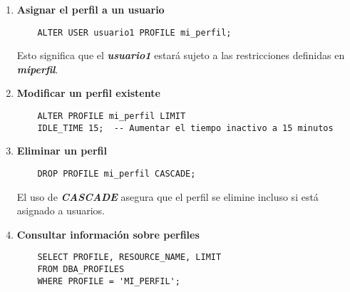 \begin{enumerate}
  \item \textbf{Asignar el perfil a un usuario}
  
  \begin{lstlisting}
    ALTER USER usuario1 PROFILE mi_perfil;
  \end{lstlisting}

  Esto significa que el \textbf{\emph{usuario1}} estará sujeto a las restricciones definidas en \textbf{\emph{mi{\textunderscore}perfil}}.

  \item \textbf{Modificar un perfil existente}
  
  \begin{lstlisting}
    ALTER PROFILE mi_perfil LIMIT
    IDLE_TIME 15;  -- Aumentar el tiempo inactivo a 15 minutos
  \end{lstlisting}

  \item \textbf{Eliminar un perfil}
  
  \begin{lstlisting}
    DROP PROFILE mi_perfil CASCADE;
  \end{lstlisting}

  El uso de \textbf{\emph{CASCADE}} asegura que el perfil se elimine incluso si está asignado a usuarios.

  \item \textbf{Consultar información sobre perfiles}
  
  \begin{lstlisting}
    SELECT PROFILE, RESOURCE_NAME, LIMIT 
    FROM DBA_PROFILES
    WHERE PROFILE = 'MI_PERFIL';
  \end{lstlisting}
\end{enumerate}